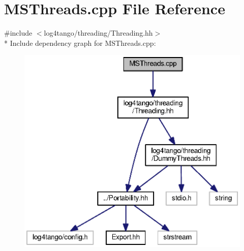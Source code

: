 \section{M\-S\-Threads.\-cpp File Reference}
\label{MSThreads_8cpp}
{\ttfamily \#include $<$log4tango/threading/\-Threading.\-hh$>$}\\*
Include dependency graph for M\-S\-Threads.\-cpp\-:
\nopagebreak
\begin{figure}[H]
\begin{center}
\leavevmode
\includegraphics[width=345pt]{df/dff/MSThreads_8cpp__incl}
\end{center}
\end{figure}
